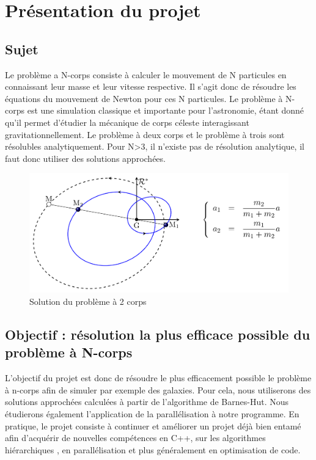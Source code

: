\chapter{Présentation du projet}
\section{Sujet}
Le problème a N-corps consiste à calculer le mouvement de  N particules en connaissant leur masse et leur vitesse respective.
Il s'agit donc de résoudre les équations du mouvement de Newton pour ces N particules.
Le problème à N-corps est une simulation classique et importante pour l'astronomie, étant donné qu'il permet d'étudier la mécanique de corps céleste interagissant gravitationnellement.
Le problème à deux corps et le problème à trois sont  résolubles analytiquement. Pour N>3, il n'existe pas de résolution analytique, il faut donc utiliser des solutions approchées.

\begin{figure}[!h]
\begin{center}
\includegraphics[width=13cm]{presentation/2_corps.png}
\end{center}
\caption{Solution du problème à 2 corps}
\end{figure}

\section{Objectif : résolution la plus efficace possible du problème à N-corps}

L'objectif du projet est donc de résoudre le plus efficacement possible le problème à n-corps afin de simuler par exemple des galaxies.
Pour cela, nous utiliserons des solutions approchées calculées à partir de l'algorithme de Barnes-Hut. Nous étudierons également l'application de la parallélisation à notre programme.
En pratique, le projet consiste à continuer et améliorer un projet déjà bien entamé afin d'acquérir de nouvelles compétences en C++, sur les algorithmes hiérarchiques , en parallélisation et plus généralement en optimisation de code.

